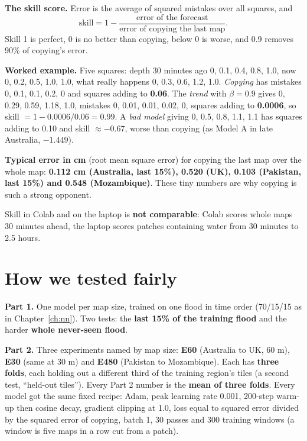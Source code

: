 \textbf{The skill score.} Error is the average of squared mistakes over all squares, and
\[ \text{skill} = 1 - \frac{\text{error of the forecast}}{\text{error of copying the last map}}. \]
Skill 1 is perfect, 0 is no better than copying, below 0 is worse, and 0.9 removes 90\% of copying's error.

\textbf{Worked example.} Five squares: depth 30 minutes ago 0, 0.1, 0.4, 0.8, 1.0, now 0, 0.2, 0.5, 1.0, 1.0, what really happens 0, 0.3, 0.6, 1.2, 1.0. \emph{Copying} has mistakes 0, 0.1, 0.1, 0.2, 0 and squares adding to \textbf{0.06}. The \emph{trend} with $\beta=0.9$ gives 0, 0.29, 0.59, 1.18, 1.0, mistakes 0, 0.01, 0.01, 0.02, 0, squares adding to \textbf{0.0006}, so skill $=1-0.0006/0.06=0.99$. A \emph{bad model} giving 0, 0.5, 0.8, 1.1, 1.1 has squares adding to 0.10 and skill $\approx-0.67$, worse than copying (as Model A in late Australia, $-1.449$).


\textbf{Typical error in cm} (root mean square error) for copying the last map over the whole map: \textbf{0.112 cm (Australia, last 15\%), 0.520 (UK), 0.103 (Pakistan, last 15\%) and 0.548 (Mozambique)}. These tiny numbers are why copying is such a strong opponent.

\begin{carefulbox}
Skill in Colab and on the laptop is \textbf{not comparable}: Colab scores whole maps 30 minutes ahead, the laptop scores patches containing water from 30 minutes to 2.5 hours.
\end{carefulbox}

\section{How we tested fairly}\label{ch:test}

\textbf{Part 1.} One model per map size, trained on one flood in time order (70/15/15 as in Chapter~\ref{ch:nn}). Two tests: the \textbf{last 15\% of the training flood} and the harder \textbf{whole never-seen flood}.

\textbf{Part 2.} Three experiments named by map size: \textbf{E60} (Australia to UK, 60 m), \textbf{E30} (same at 30 m) and \textbf{E480} (Pakistan to Mozambique). Each has \textbf{three folds}, each holding out a different third of the training region's tiles (a second test, ``held-out tiles''). Every Part 2 number is the \textbf{mean of three folds}. Every model got the same fixed recipe: Adam, peak learning rate 0.001, 200-step warm-up then cosine decay, gradient clipping at 1.0, loss equal to squared error divided by the squared error of copying, batch 1, 30 passes and 300 training windows (a window is five maps in a row cut from a patch).

